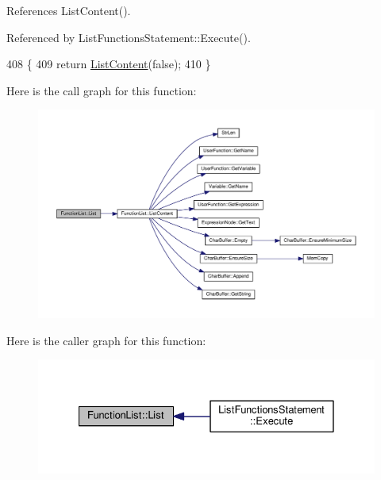 References List\+Content().



Referenced by List\+Functions\+Statement\+::\+Execute().


\begin{DoxyCode}
408 \{
409     \textcolor{keywordflow}{return} \hyperlink{classFunctionList_ac87c5ecfbdfd7aa7c9c8c611b70c3a63}{ListContent}(\textcolor{keyword}{false});
410 \}
\end{DoxyCode}


Here is the call graph for this function\+:\nopagebreak
\begin{figure}[H]
\begin{center}
\leavevmode
\includegraphics[width=350pt]{classFunctionList_a667bf5683f0b7332b5607781df53c728_cgraph}
\end{center}
\end{figure}




Here is the caller graph for this function\+:\nopagebreak
\begin{figure}[H]
\begin{center}
\leavevmode
\includegraphics[width=328pt]{classFunctionList_a667bf5683f0b7332b5607781df53c728_icgraph}
\end{center}
\end{figure}


